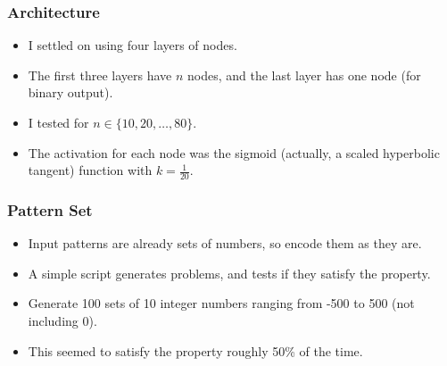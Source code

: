 \documentclass{beamer}
\numberwithin{equation}{section} %
\begin{document}
\begin{frame}
    \frametitle{Architecture}
    \begin{itemize}
        \item I settled on using four layers of nodes.
        \pause
        \item The first three layers have $n$ nodes, and the last layer has one node (for binary output).
        \pause
        \item I tested for $n\in\{10, 20, \ldots, 80\}$.
        \pause
        \item The activation for each node was the sigmoid (actually, a scaled hyperbolic tangent) function with $k=\frac{1}{20}$.
    \end{itemize}
\end{frame}

\begin{frame}
    \frametitle{Pattern Set}
    \begin{itemize}
        \item Input patterns are already sets of numbers, so encode them as they are.
        \pause
        \item A simple script generates problems, and tests if they satisfy the property.
        \pause
        \item Generate 100 sets of 10 integer numbers ranging from -500 to 500 (not including 0).
        \pause
        \item This seemed to satisfy the property roughly 50\% of the time.
    \end{itemize}
\end{frame}
\end{document}
